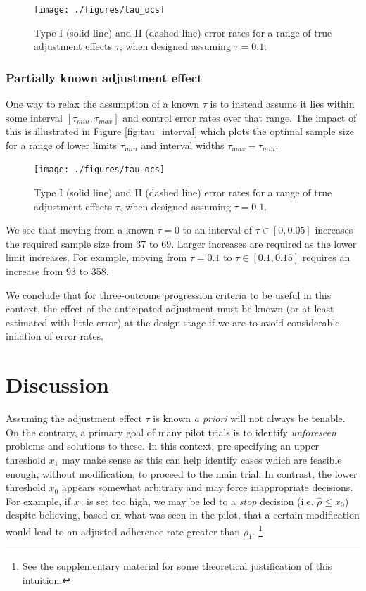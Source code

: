 \documentclass{bmcart}
\begin{document}
\begin{figure}
\centering
\texttt{[image: ./figures/tau\_ocs]}
\caption{Type I (solid line) and II (dashed line) error rates for a range of true adjustment effects $\tau$, when designed assuming $\tau = 0.1$.}
\label{fig:tau_ocs}
\end{figure}

\subsubsection{Partially known adjustment effect}

One way to relax the assumption of a known $\tau$ is to instead assume it lies within some interval $[\tau_{min}, \tau_{max}]$ and control error rates over that range. The impact of this is illustrated in Figure \ref{fig:tau_interval} which plots the optimal sample size for a range of lower limits $\tau_{min}$ and interval widths $\tau_{max} - \tau_{min}$.

\begin{figure}
\centering
\texttt{[image: ./figures/tau\_ocs]}
\caption{Type I (solid line) and II (dashed line) error rates for a range of true adjustment effects $\tau$, when designed assuming $\tau = 0.1$.}
\label{fig:tau_ocs}
\end{figure}

We see that moving from a known $\tau = 0$ to an interval of $\tau \in [0, 0.05]$ increases the required sample size from 37 to 69. Larger increases are required as the lower limit increases. For example,  moving from $\tau = 0.1$ to $\tau \in [0.1, 0.15]$ requires an increase from 93 to 358. 

We conclude that for three-outcome progression criteria to be useful in this context, the effect of the anticipated adjustment must be known (or at least estimated with little error) at the design stage if we are to avoid considerable inflation of error rates.

\section{Discussion}\label{sec:discussion}

Assuming the adjustment effect $\tau$ is known \emph{a priori} will not always be tenable. On the contrary, a primary goal of many pilot trials is to identify \emph{unforeseen} problems and solutions to these. In this context, pre-specifying an upper threshold $x_1$ may make sense as this can help identify cases which are feasible enough, without modification, to proceed to the main trial. In contrast, the lower threshold $x_0$ appears somewhat arbitrary and may force inappropriate decisions. For example, if $x_0$ is set too high, we may be led to a \emph{stop} decision (i.e. $\hat{\rho} \leq x_0$) despite believing, based on what was seen in the pilot, that a certain modification would lead to an adjusted adherence rate greater than $\rho_1$.
\footnote{See the supplementary material for some theoretical justification of this intuition.}
\end{document}
